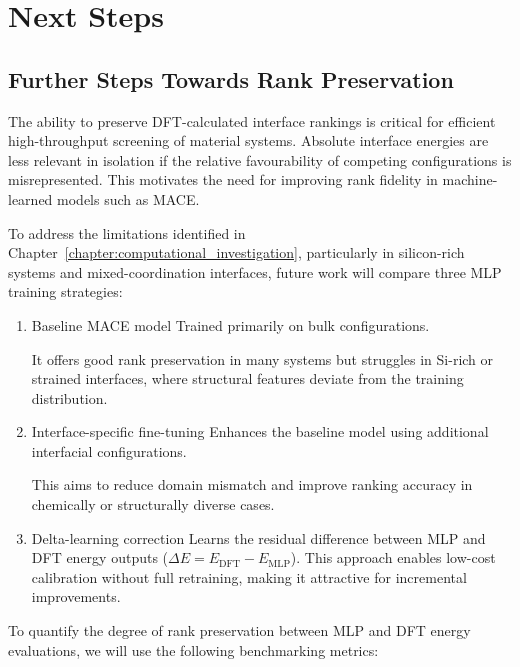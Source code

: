 \chapter{Next Steps} \label{chapter:next_steps}

\section{Further Steps Towards Rank Preservation} \label{section:rank_preservation}

The ability to preserve DFT-calculated interface rankings is critical for efficient high-throughput screening of material systems\cite{Gerber2023-yd, Nykiel2023-jf, Di_Liberto2022-gz}.
Absolute interface energies are less relevant in isolation if the relative favourability of competing configurations is misrepresented.
This motivates the need for improving rank fidelity in machine-learned models such as MACE\cite{Chagarov2015-ol, Leung2020-tv, Gerber2023-yd}.

To address the limitations identified in Chapter~\ref{chapter:computational_investigation}, particularly in silicon-rich systems and mixed-coordination interfaces, future work will compare three MLP training strategies:

\begin{enumerate}
    \item Baseline MACE model Trained primarily on bulk configurations.

    It offers good rank preservation in many systems but struggles in Si-rich or strained interfaces, where structural features deviate from the training distribution.
    \item Interface-specific fine-tuning Enhances the baseline model using additional interfacial configurations.

    This aims to reduce domain mismatch and improve ranking accuracy in chemically or structurally diverse cases.
    \newpage \item Delta-learning correction Learns the residual difference between MLP and DFT energy outputs ($\Delta E = E_\mathrm{DFT} - E_\mathrm{MLP}$). This approach enables low-cost calibration without full retraining, making it attractive for incremental improvements\cite{Batatia2022-xz}.
\end{enumerate}

To quantify the degree of rank preservation between MLP and DFT energy evaluations, we will use the following benchmarking metrics:

